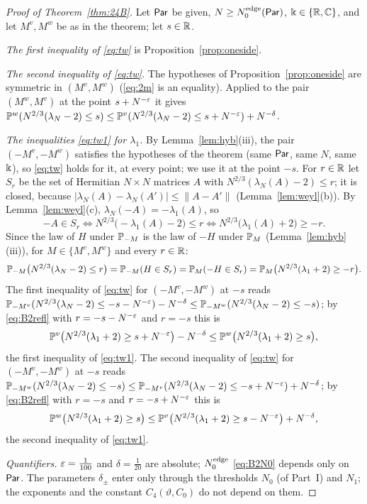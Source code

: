 \begin{proof}[Proof of Theorem~\ref{thm:24B}]
Let $\Par$ be given, $N\ge N_0^{\rm edge}(\Par)$, $\K\in\{\R,\C\}$, and let $M^v,M^w$ be as in the theorem; let $s\in\R$.

\emph{The first inequality of \eqref{eq:tw}} is Proposition~\ref{prop:oneside}.

\emph{The second inequality of \eqref{eq:tw}.} The hypotheses of Proposition~\ref{prop:oneside} are symmetric in $(M^v,M^w)$ (\eqref{eq:2m} is an equality). Applied to the pair
$(M^w,M^v)$ at the point $s+N^{-\e}$ it gives $\P^w(N^{2/3}(\lambda_N-2)\le s)\le\P^v(N^{2/3}(\lambda_N-2)\le s+N^{-\e})+N^{-\delta}$.

\emph{The inequalities \eqref{eq:tw1} for $\lambda_1$.} By Lemma~\ref{lem:hyb}(iii), the pair $(-M^v,-M^w)$ satisfies the hypotheses of the theorem (same $\Par$, same $N$, same $\K$),
so \eqref{eq:tw} holds for it, at every point; we use it at the point $-s$. For $r\in\R$ let $S_r$ be the set of Hermitian $N\times N$ matrices $A$ with
$N^{2/3}(\lambda_N(A)-2)\le r$; it is closed, because $|\lambda_N(A)-\lambda_N(A')|\le\|A-A'\|$ (Lemma~\ref{lem:weyl}(b)). By Lemma~\ref{lem:weyl}(c), $\lambda_N(-A)=-\lambda_1(A)$, so
\[
-A\in S_r\iff N^{2/3}\big(-\lambda_1(A)-2\big)\le r\iff N^{2/3}\big(\lambda_1(A)+2\big)\ge-r .
\]
Since the law of $H$ under $\P_{-M}$ is the law of $-H$ under $\P_M$ (Lemma~\ref{lem:hyb}(iii)), for $M\in\{M^v,M^w\}$ and every $r\in\R$:
\begin{equation}\label{eq:B2refl}
\P_{-M}\big(N^{2/3}(\lambda_N-2)\le r\big)=\P_{-M}(H\in S_r)=\P_M(-H\in S_r)=\P_M\big(N^{2/3}(\lambda_1+2)\ge-r\big).
\end{equation}
The first inequality of \eqref{eq:tw} for $(-M^v,-M^w)$ at $-s$ reads
$\P_{-M^v}(N^{2/3}(\lambda_N-2)\le-s-N^{-\e})-N^{-\delta}\le\P_{-M^w}(N^{2/3}(\lambda_N-2)\le-s)$; by \eqref{eq:B2refl} with $r=-s-N^{-\e}$ and $r=-s$ this is
\[
\P^v\big(N^{2/3}(\lambda_1+2)\ge s+N^{-\e}\big)-N^{-\delta}\le\P^w\big(N^{2/3}(\lambda_1+2)\ge s\big),
\]
the first inequality of \eqref{eq:tw1}. The second inequality of \eqref{eq:tw} for $(-M^v,-M^w)$ at $-s$ reads
$\P_{-M^w}(N^{2/3}(\lambda_N-2)\le-s)\le\P_{-M^v}(N^{2/3}(\lambda_N-2)\le-s+N^{-\e})+N^{-\delta}$; by \eqref{eq:B2refl} with $r=-s$ and $r=-s+N^{-\e}$ this is
\[
\P^w\big(N^{2/3}(\lambda_1+2)\ge s\big)\le\P^v\big(N^{2/3}(\lambda_1+2)\ge s-N^{-\e}\big)+N^{-\delta},
\]
the second inequality of \eqref{eq:tw1}.

\emph{Quantifiers.} $\e=\frac1{100}$ and $\delta=\frac1{20}$ are absolute; $N_0^{\rm edge}$ \eqref{eq:B2N0} depends only on $\Par$. The parameters $\delta_\pm$ enter only through the
thresholds $N_0$ (of Part~I) and $N_1$; the exponents and the constant $C_4(\vartheta,C_0)$ do not depend on them.
\end{proof}

